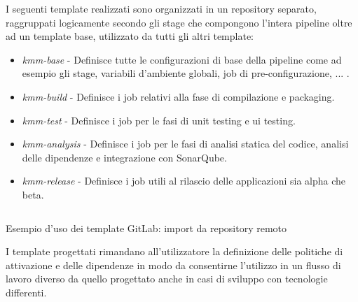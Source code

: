I seguenti template realizzati sono organizzati in un repository separato, raggruppati logicamente secondo gli stage che compongono l'intera pipeline oltre ad un template base, utilizzato da tutti gli altri template:
\begin{itemize}
    \item \textit{kmm-base} - Definisce tutte le configurazioni di base della pipeline come ad esempio gli stage, variabili d'ambiente globali, job di pre-configurazione, ... .
    \item \textit{kmm-build} - Definisce i job relativi alla fase di compilazione e packaging.
    \item \textit{kmm-test} - Definisce i job per le fasi di unit testing e ui testing.
    \item \textit{kmm-analysis} - Definisce i job per le fasi di analisi statica del codice, analisi delle dipendenze e integrazione con SonarQube.
    \item \textit{kmm-release} - Definisce i job utili al rilascio delle applicazioni sia alpha che beta.
\end{itemize}

\begin{listing}[H]
\inputminted{yaml}{code/4-templating}
\caption{Esempio d'uso dei template GitLab: import da repository remoto}
\end{listing}

I template progettati rimandano all'utilizzatore la definizione delle politiche di attivazione e delle dipendenze in modo da consentirne l'utilizzo in un flusso di lavoro diverso da quello progettato anche in casi di sviluppo con tecnologie differenti.

